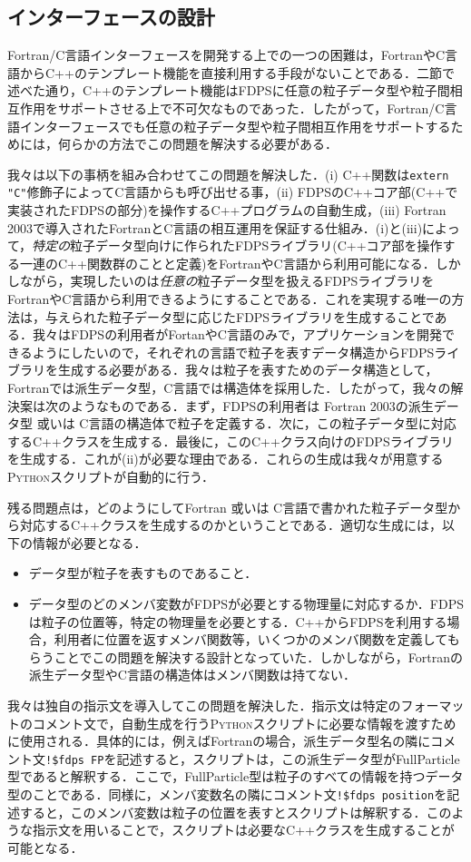 \subsection{インターフェースの設計}
Fortran/C言語インターフェースを開発する上での一つの困難は，FortranやC言語からC++のテンプレート機能を直接利用する手段がないことである．二節で述べた通り，C++のテンプレート機能はFDPSに任意の粒子データ型や粒子間相互作用をサポートさせる上で不可欠なものであった．したがって，Fortran/C言語インターフェースでも任意の粒子データ型や粒子間相互作用をサポートするためには，何らかの方法でこの問題を解決する必要がある．

我々は以下の事柄を組み合わせてこの問題を解決した．(i) C++関数は\texttt{extern "C"}修飾子によってC言語からも呼び出せる事，(ii) FDPSのC++コア部(C++で実装されたFDPSの部分)を操作するC++プログラムの自動生成，(iii) Fortran 2003で導入されたFortranとC言語の相互運用を保証する仕組み．(i)と(iii)によって，\textsl{特定の}粒子データ型向けに作られたFDPSライブラリ(C++コア部を操作する一連のC++関数群のことと定義)をFortranやC言語から利用可能になる．しかしながら，実現したいのは\textsl{任意の}粒子データ型を扱えるFDPSライブラリをFortranやC言語から利用できるようにすることである．これを実現する唯一の方法は，与えられた粒子データ型に応じたFDPSライブラリを生成することである．我々はFDPSの利用者がFortanやC言語のみで，アプリケーションを開発できるようにしたいので，それぞれの言語で粒子を表すデータ構造からFDPSライブラリを生成する必要がある．我々は粒子を表すためのデータ構造として，Fortranでは派生データ型，C言語では構造体を採用した．したがって，我々の解決案は次のようなものである．まず，FDPSの利用者は Fortran 2003の派生データ型 或いは C言語の構造体で粒子を定義する．次に，この粒子データ型に対応するC++クラスを生成する．最後に，このC++クラス向けのFDPSライブラリを生成する．これが(ii)が必要な理由である．これらの生成は我々が用意する\textsc{Python}スクリプトが自動的に行う．

残る問題点は，どのようにしてFortran 或いは C言語で書かれた粒子データ型から対応するC++クラスを生成するのかということである．適切な生成には，以下の情報が必要となる．
\begin{itemize}
\item データ型が粒子を表すものであること．
\item データ型のどのメンバ変数がFDPSが必要とする物理量に対応するか．FDPSは粒子の位置等，特定の物理量を必要とする．C++からFDPSを利用する場合，利用者に位置を返すメンバ関数等，いくつかのメンバ関数を定義してもらうことでこの問題を解決する設計となっていた．しかしながら，Fortranの派生データ型やC言語の構造体はメンバ関数は持てない．
\end{itemize}
我々は独自の指示文を導入してこの問題を解決した．指示文は特定のフォーマットのコメント文で，自動生成を行う\textsc{Python}スクリプトに必要な情報を渡すために使用される．具体的には，例えばFortranの場合，派生データ型名の隣にコメント文\texttt{!\$fdps FP}を記述すると，スクリプトは，この派生データ型がFullParticle型であると解釈する．ここで，FullParticle型は粒子のすべての情報を持つデータ型のことである．同様に，メンバ変数名の隣にコメント文\texttt{!\$fdps position}を記述すると，このメンバ変数は粒子の位置を表すとスクリプトは解釈する．このような指示文を用いることで，スクリプトは必要なC++クラスを生成することが可能となる．

